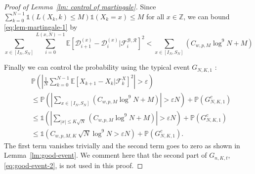 \documentclass[EJP]{ejpecp} %
\begin{document}
\begin{proof}[Proof of Lemma~\ref{lm: control of martingale}]
	Since $\sum_{k = 0}^{N-1} \mathbb{1}\left( L(X_k, k) \le M \right) \mathbb{1}(X_k = x) \le  M$ for all $x \in \mathbb{Z}$, we can bound \eqref{eq:lem-martingale-1} by
	\begin{equation*}
		\sum_{x \in \left[ I_N, S_N \right]} \sum_{i = 0}^{L(x,N) - 1} \mathbb{E}\left[ \mathcal{D}_{i+1}^{(x)} - \mathcal{D}_i^{(x)} | \mathcal{F}_{i}^{\mathcal{B}, \mathcal{R}} \right]^2 
		< \sum_{x \in \left[ I_N, S_N \right]} (C_{w, p, M} \log^9 N +M )
	\end{equation*}
	
	Finally we can control the probability using the typical event $G_{N, K, 1}$ :
	\begin{align*}
		&\mathbb{P}\left( \left| \frac{1}{N} \sum_{k = 0}^{N-1} \mathbb{E}\left[ X_{k+1} - X_k | \mathcal{F}_k^X \right]^2  \right|  > \varepsilon \right)\\
		&\le \mathbb{P}\left( \left| \sum_{x \in \left[ I_N, S_N \right]} (C_{w, p, M} \log^9 N +M ) \right| > \varepsilon  N \right) + \mathbb{P}\left( G_{N, K, 1}^c \right)  \\
		&\le \mathbb{1}\left(  \left| \sum_{|x| \le K \sqrt{N} } (C_{w, p, M} \log^9 N +M ) \right| > \varepsilon  N  \right) + \mathbb{P}\left( G_{N, K, 1}^c \right)  \\
		&\le \mathbb{1}\left(  C_{w, p, M, K} \, \sqrt{N} \log^9 N > \varepsilon  N  \right) + \mathbb{P}\left( G_{N, K, 1}^c \right) 
		.\end{align*}
	The first term vanishes trivially and the second term goes to zero as shown in Lemma~\ref{lm:good-event}. 
	We comment here that the second part of $G_{n, K, t}$, \eqref{eq:good-event-2}, is not used in this proof.
\end{proof}
\end{document}

